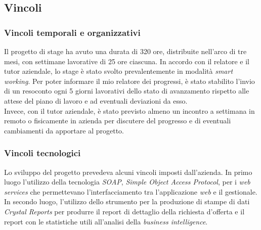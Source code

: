 \subsection{Vincoli}
\subsubsection{Vincoli temporali e organizzativi}
Il progetto di stage ha avuto una durata di 320 ore, distribuite nell'arco di tre mesi, con settimane lavorative di 25 ore ciascuna.
In accordo con il relatore e il tutor aziendale, lo stage è stato svolto prevalentemente in modalità \textit{smart working}.
Per poter informare il mio relatore  dei progressi, è stato stabilito l'invio di un resoconto ogni 5 giorni lavorativi dello stato di avanzamento rispetto alle attese del piano di lavoro e ad eventuali deviazioni da esso.\\Invece, con il tutor aziendale, è stato previsto almeno un incontro a settimana in remoto o fisicamente in azienda per discutere del progresso e di eventuali cambiamenti da apportare al progetto.
\subsubsection{Vincoli tecnologici}
Lo sviluppo del progetto prevedeva alcuni vincoli imposti dall'azienda.
In primo luogo l'utilizzo della tecnologia \textit{SOAP}, \textit{Simple Object Access Protocol}, per i \textit{web services} che permettevano l'interfacciamento tra l'applicazione \textit{web} e il gestionale.
In secondo luogo, l'utilizzo dello strumento per la produzione di stampe di dati \textit{Crystal Reports} per produrre il report di dettaglio della richiesta d'offerta e il report con le statistiche utili all'analisi della \textit{business intelligence}.
